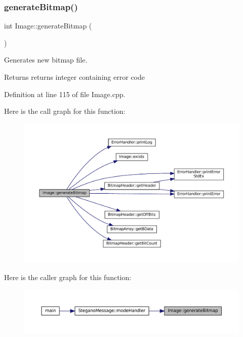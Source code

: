 \subsubsection{\texorpdfstring{generateBitmap()}{generateBitmap()}}
{\footnotesize\ttfamily int Image\+::generate\+Bitmap (\begin{DoxyParamCaption}{ }\end{DoxyParamCaption})}



Generates new bitmap file. 

\begin{DoxyReturn}{Returns}
returns integer containing error code 
\end{DoxyReturn}


Definition at line 115 of file Image.\+cpp.

Here is the call graph for this function\+:\nopagebreak
\begin{figure}[H]
\begin{center}
\leavevmode
\includegraphics[width=350pt]{classImage_a3ca1ae6c1eb2846bfba066b01e6020e1_cgraph}
\end{center}
\end{figure}
Here is the caller graph for this function\+:\nopagebreak
\begin{figure}[H]
\begin{center}
\leavevmode
\includegraphics[width=350pt]{classImage_a3ca1ae6c1eb2846bfba066b01e6020e1_icgraph}
\end{center}
\end{figure}
\mbox{\label{classImage_a75b5051c6cc39a5e3f86d287f5cc7f9c}} 
